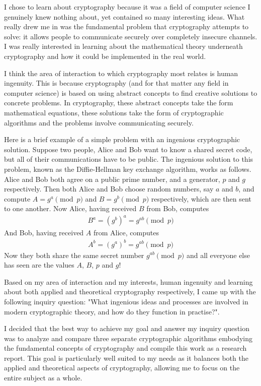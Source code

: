\documentclass[12pt, a4paper, draft]{report}
\begin{document}
I chose to learn about cryptography because it was a field of computer
science I genuinely knew nothing about, yet contained so many interesting
ideas. What really drew me in was the fundamental problem that cryptography
attempts to solve: it allows people to communicate securely over completely
insecure channels. I was really interested in learning about the mathematical
theory underneath cryptography and how it could be implemented in the real
world.

I think the area of interaction to which cryptography most relates is
human ingenuity. This is because cryptography (and for that matter any
field in computer science) is based on using abstract concepts to find
creative solutions to concrete problems. In cryptography, these abstract
concepts take the form mathematical equations, these solutions take the form
of cryptographic algorithms and the problems involve communicating securely.

Here is a brief example of a simple problem with an ingenious cryptographic
solution. Suppose two people, Alice and Bob want to know a shared secret
code, but all of their communications have to be public. The ingenious
solution to this problem, known as the Diffie-Hellman key exchange algorithm,
works as follows. Alice and Bob both agree on a public prime number, and
a generator, $p$ and $g$ respectively. Then both Alice and Bob
choose random numbers, say $a$ and $b$, and compute $A = g^a \pmod{p}$ and
$B = g^b \pmod{p}$ respectively, which are then sent to one another. Now
Alice, having received $B$ from Bob, computes
\begin{align*}
B^a = (g^b)^a = g^{ab} \pmod{p}
\end{align*}
And Bob, having received $A$ from Alice, computes
\begin{align*}
A^b = (g^a)^b = g^{ab} \pmod{p}
\end{align*}
Now they both share the same secret number $g^{ab} \pmod{p}$ and all
everyone else has seen are the values $A$, $B$, $p$ and $g$!

Based on my area of interaction and my interests, human ingenuity and
learning about both applied and theoretical cryptography respectively, I
came up with the following inquiry question: "What ingenious ideas and
processes are involved in modern cryptographic theory, and how do they
function in practise?".

I decided that the best way to achieve my goal and answer my inquiry
question was to analyze and compare three separate cryptographic algorithms
embodying the fundamental concepts of cryptography and compile this
work as a research report. This goal is particularly well suited to my
needs as it balances both the applied and theoretical aspects of cryptography,
allowing me to focus on the entire subject as a whole.
\end{document}
